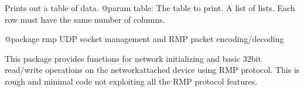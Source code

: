 \documentclass[letterpaper,10pt,english]{sphinxmanual}
\begin{document}
\begin{fulllineitems}
\label{\detokenize{cplddocs:reg.pprint_table}}
\pysigstartsignatures
{}
\pysigstopsignatures
\sphinxAtStartPar
Prints out a table of data.
@param table: The table to print. A list of lists.
Each row must have the same number of columns.

\end{fulllineitems}

\label{\detokenize{cplddocs:module-rmp}}
\sphinxAtStartPar
@package rmp
UDP socket management and RMP packet encoding/decoding

\sphinxAtStartPar
This package provides functions for network initializing and basic 32\sphinxhyphen{}bit read/write
operations on the network\sphinxhyphen{}attached device using RMP protocol. This is rough and minimal code
not exploiting all the RMP protocol features.
\label{\detokenize{cplddocs:module-management_bsp}}\label{\detokenize{cplddocs:module-management_flash}}
\end{document}
